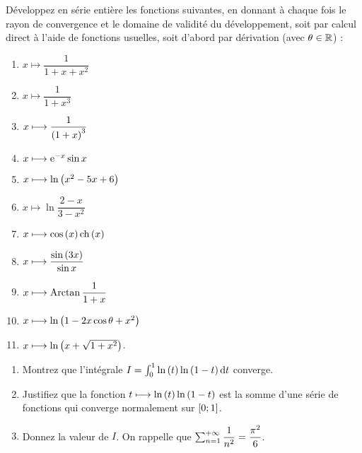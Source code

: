 \begin{exoss}
Développez en série entière les fonctions suivantes, en donnant à chaque fois le rayon de convergence et le domaine de validité du développement, soit par calcul direct à l'aide de fonctions usuelles, soit d'abord par dérivation (avec \(\theta\in\mathbb{R}\)) :

\begin{enumerate}
    \item \(x\mapsto\dfrac{1}{1+x+x^2}\) \\
    \item \(x\mapsto\dfrac{1}{1+x^3}\) \\
    \item \(x\longmapsto\dfrac{1}{\left(1+x\right)^3}\) \\
    \item \(x\longmapsto\mathrm{e}^{-x}\sin x\) \\
    \item \(x\longmapsto\ln\left(x^2-5x+6\right)\) \\
    \item \(x\mapsto\ln\dfrac{2-x}{3-x^2}\) \\
    \item \(x\longmapsto\cos\left(x\right)\operatorname{ch}\left(x\right)\) \\
    \item \(x\longmapsto\dfrac{\sin\left(3x\right)}{\sin x}\) \\
    \item \(x\longmapsto\operatorname{Arctan}\dfrac{1}{1+x}\) \\
    \item \(x\longmapsto\ln\left(1-2x\cos\theta+x^2\right)\) \\
    \item \(x\longmapsto\ln\left(x+\sqrt{1+x^2}\right)\).
\end{enumerate}
\end{exoss}

\begin{exoss}
\begin{enumerate}
    \item Montrez que l'intégrale \(I=\int_0^1\ln\paren{t}\ln\paren{1-t}\odif{t}\) converge. \\
    \item Justifiez que la fonction \(t\longmapsto\ln\left(t\right)\ln\left(1-t\right)\) est la somme d'une série de fonctions qui converge normalement sur \(\left[0;1\right]\). \\
    \item Donnez la valeur de \(I\). On rappelle que \(\sum_{n=1}^{+\infty}\dfrac{1}{n^2}=\dfrac{\pi^2}{6}\).
\end{enumerate}
\end{exoss}

